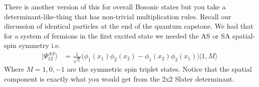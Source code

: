 \documentclass[a4paper, 11pt]{article}
\begin{document}
	\noindent There is another version of this for overall Bosonic states but you take a determinant-like-thing that has non-trivial multiplication rules. Recall our discussion of identical particles at the end of the quantum capstone. We had that for a system of fermions in the first excited state we needed the AS or SA spatial-spin symmetry i.e. 
		\begin{align*}
			|\Psi_{12}^{AS}\rangle &= \frac{1}{\sqrt{2}}\Big(\phi_1(x_1)\phi_2(x_2)-\phi_1(x_2)\phi_2(x_1)\Big)|1, M\rangle
		\end{align*}
	Where $M = 1,0,-1$ are the symmetric spin triplet states. Notice that the spatial component is exactly what you would get from the 2x2 Slater determinant. 
\end{document}
